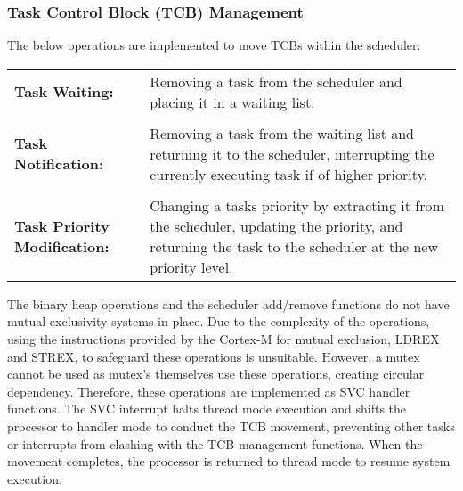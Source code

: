\subsubsection{Task Control Block (TCB) Management}
The below operations are implemented to move TCBs within the scheduler:
\setlength\tabcolsep{0pt}
\begin{center}
	\begin{tabularx}{1\textwidth}{ p{} p{} }
		\textbf{Task Waiting:}	& Removing a task from the scheduler and placing it in a waiting list.\\
		
		&\\
		
		\textbf{Task Notification:}	& Removing a task from the waiting list and returning it to the scheduler, interrupting the currently executing task if of higher priority.\\
		
		&\\
		
		\textbf{Task Priority \newline Modification:} 	& Changing a tasks priority by extracting it from the scheduler, updating the priority, and returning the task to the scheduler at the new priority level. \\
	\end{tabularx}
\end{center}
The binary heap operations and the scheduler add/remove functions do not have mutual exclusivity systems in place. Due to the complexity of the operations, using the instructions provided by the Cortex-M for mutual exclusion, LDREX and STREX, to safeguard these operations is unsuitable. However, a mutex cannot be used as mutex’s themselves use these operations, creating circular dependency. Therefore, these operations are implemented as SVC handler functions. The SVC interrupt halts thread mode execution and shifts the processor to handler mode to conduct the TCB movement, preventing other tasks or interrupts from clashing with the TCB management functions. When the movement completes, the processor is returned to thread mode to resume system execution.
